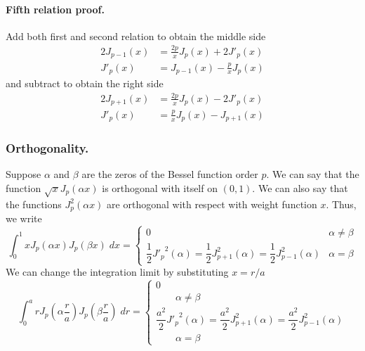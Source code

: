 \documentclass[../main.tex]{subfiles}
\begin{document}
\paragraph*{Fifth relation proof.} Add both first and second relation to obtain the middle side 
\begin{align*}
    2J_{p-1}(x)&=\frac{2p}{x}J_p(x)+2J'_p(x)\\
    J'_{p}(x)&=J_{p-1}(x)-\frac{p}{x}J_p(x)
\end{align*}
and subtract to obtain the right side
\begin{align*}
    2J_{p+1}(x)&=\frac{2p}{x}J_p(x)-2J'_p(x)\\
    J'_{p}(x)&=\frac{p}{x}J_p(x)-J_{p+1}(x)
\end{align*}

\subsubsection*{Orthogonality.} Suppose $\alpha$ and $\beta$ are the zeros of the Bessel function order $p$. We can say that the function $\sqrt{x}J_p(\alpha x)$ is orthogonal with itself on $(0,1)$. We can also say that the functions $J_p^2(\alpha x)$ are orthogonal with respect with weight function $x$. Thus, we write
\begin{equation*}
    \int_{0}^{1}xJ_p(\alpha x)J_p(\beta x)\;dx=\begin{cases}
        0&\alpha\neq \beta\\
        \dfrac{1}{2}{J'_p}^2(\alpha)=\dfrac{1}{2}J_{p+1}^2(\alpha) =\dfrac{1}{2}J_{p-1}^2(\alpha)&\alpha=\beta
    \end{cases}
\end{equation*}
We can change the integration limit by substituting $x=r/a$
\begin{equation*}
    \int_{0}^{a}rJ_p\left(\alpha \frac{r}{a}\right)J_p\left(\beta \frac{r}{a}\right)\;dr=\begin{cases}
        0\\
        \qquad \alpha\neq \beta\\
        \dfrac{a^2}{2}{J'_p}^2(\alpha)=\dfrac{a^2}{2}J_{p+1}^2(\alpha) =\dfrac{a^2}{2}J_{p-1}^2(\alpha)\\
        \qquad\alpha=\beta
    \end{cases}
\end{equation*}
\end{document}
